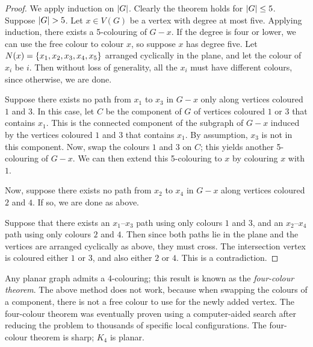 \begin{proof}
	We apply induction on \( \abs{G} \).
	Clearly the theorem holds for \( \abs{G} \leq 5 \).
	Suppose \( \abs{G} > 5 \).
	Let \( x \in V(G) \) be a vertex with degree at most five.
	Applying induction, there exists a 5-colouring of \( G - x \).
	If the degree is four or lower, we can use the free colour to colour \( x \), so suppose \( x \) has degree five.
	Let \( N(x) = \qty{x_1, x_2, x_3, x_4, x_5} \) arranged cyclically in the plane, and let the colour of \( x_i \) be \( i \).
	Then without loss of generality, all the \( x_i \) must have different colours, since otherwise, we are done.

	Suppose there exists no path from \( x_1 \) to \( x_3 \) in \( G - x \) only along vertices coloured \( 1 \) and \( 3 \).
	In this case, let \( C \) be the component of \( G \) of vertices coloured \( 1 \) or \( 3 \) that contains \( x_1 \).
	This is the connected component of the subgraph of \( G - x \) induced by the vertices coloured \( 1 \) and \( 3 \) that contains \( x_1 \).
	By assumption, \( x_3 \) is not in this component.
	Now, swap the colours \( 1 \) and \( 3 \) on \( C \); this yields another 5-colouring of \( G - x \).
	We can then extend this 5-colouring to \( x \) by colouring \( x \) with \( 1 \).

	Now, suppose there exists no path from \( x_2 \) to \( x_4 \) in \( G - x \) along vertices coloured \( 2 \) and \( 4 \).
	If so, we are done as above.

	Suppose that there exists an \( x_1 \)--\( x_3 \) path using only colours \( 1 \) and \( 3 \), and an \( x_2 \)--\( x_4 \) path using only colours \( 2 \) and \( 4 \).
	Then since both paths lie in the plane and the vertices are arranged cyclically as above, they must cross.
	The intersection vertex is coloured either \( 1 \) or \( 3 \), and also either \( 2 \) or \( 4 \).
	This is a contradiction.
\end{proof}
\begin{remark}
	Any planar graph admits a 4-colouring; this result is known as the \emph{four-colour theorem}.
	The above method does not work, because when swapping the colours of a component, there is not a free colour to use for the newly added vertex.
	The four-colour theorem was eventually proven using a computer-aided search after reducing the problem to thousands of specific local configurations.
	The four-colour theorem is sharp; \( K_4 \) is planar.
\end{remark}


